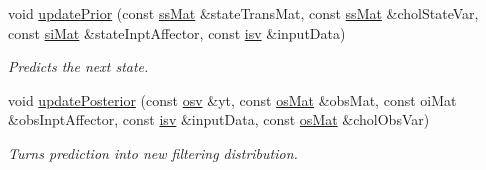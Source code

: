 \begin{DoxyCompactItemize}
void \hyperlink{classpf_1_1kalman_ada09b42d4d99ea42b89e7d4a192d59a1}{update\+Prior} (const \hyperlink{classpf_1_1kalman_aff9ecb9b57dfc3f115a372a765781561}{ss\+Mat} \&state\+Trans\+Mat, const \hyperlink{classpf_1_1kalman_aff9ecb9b57dfc3f115a372a765781561}{ss\+Mat} \&chol\+State\+Var, const \hyperlink{classpf_1_1kalman_afc940e82542b4dcce4a0834297d98781}{si\+Mat} \&state\+Inpt\+Affector, const \hyperlink{classpf_1_1kalman_a6cbcd532087d0b69bcf1825d8d4ac25a}{isv} \&input\+Data)
\begin{DoxyCompactList}\small\item\em Predicts the next state. \end{DoxyCompactList}\item 
void \hyperlink{classpf_1_1kalman_a75a2c684bb44815258fb91f1b66ed9c0}{update\+Posterior} (const \hyperlink{classpf_1_1kalman_a0568355548ed0e2cae065b489b2428c1}{osv} \&yt, const \hyperlink{classpf_1_1kalman_a41a83764417fa43c3eb0898676791efa}{os\+Mat} \&obs\+Mat, const oi\+Mat \&obs\+Inpt\+Affector, const \hyperlink{classpf_1_1kalman_a6cbcd532087d0b69bcf1825d8d4ac25a}{isv} \&input\+Data, const \hyperlink{classpf_1_1kalman_a41a83764417fa43c3eb0898676791efa}{os\+Mat} \&chol\+Obs\+Var)
\begin{DoxyCompactList}\small\item\em Turns prediction into new filtering distribution. \end{DoxyCompactList}\end{DoxyCompactItemize}
